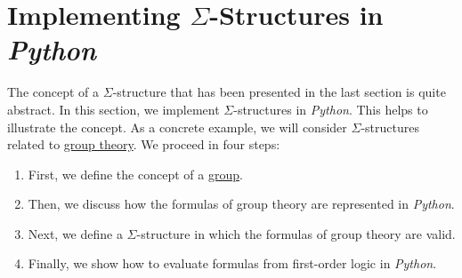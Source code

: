 \section{Implementing $\Sigma$-Structures in \textsl{Python}}
The concept of a $\Sigma$-structure that has been presented in the last section is quite abstract. In this
section, we implement $\Sigma$-structures in \textsl{Python}. This helps to illustrate the concept. As a
concrete example, we will consider $\Sigma$-structures related to
\href{https://en.wikipedia.org/wiki/Group_theory}{group theory}. 
We proceed in four steps:
\begin{enumerate}
\item First, we define the concept of a \href{https://en.wikipedia.org/wiki/Group_(mathematics)}{group}.
\item Then, we discuss how the formulas of group theory are represented in \textsl{Python}.
\item Next, we define a $\Sigma$-structure in which the formulas of group theory are valid.
\item Finally, we show how to evaluate formulas from first-order logic in \textsl{Python}.
\end{enumerate}

